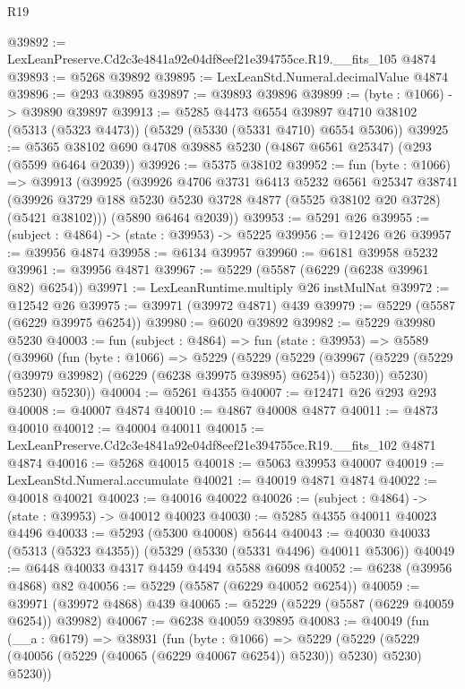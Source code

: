 \begin{lexlean}{R19}
\begin{coremodule}
@39892 := LexLeanPreserve.Cd2c3e4841a92e04df8eef21e394755ce.R19.__fits_105 @4874
@39893 := @5268 @39892
@39895 := LexLeanStd.Numeral.decimalValue @4874
@39896 := @293 @39895
@39897 := @39893 @39896
@39899 := (byte : @1066) -> @39890 @39897
@39913 := @5285
    @4473
    @6554
    @39897
    @4710
    @38102
    (@5313 (@5323 @4473))
    (@5329 (@5330 (@5331 @4710) @6554 @5306))
@39925 := @5365 @38102 @690 @4708 @39885 @5230 (@4867 @6561 @25347) (@293 (@5599 @6464 @2039))
@39926 := @5375 @38102
@39952 := fun (byte : @1066) =>
  @39913
    (@39925
      (@39926
        @4706
        @3731
        @6413
        @5232
        @6561
        @25347
        @38741
        (@39926 @3729 @188 @5230 @5230 @3728 @4877 (@5525 @38102 @20 @3728) (@5421 @38102)))
      (@5890 @6464 @2039))
@39953 := @5291 @26
@39955 := (subject : @4864) -> (state : @39953) -> @5225
@39956 := @12426 @26
@39957 := @39956 @4874
@39958 := @6134 @39957
@39960 := @6181 @39958 @5232
@39961 := @39956 @4871
@39967 := @5229 (@5587 (@6229 (@6238 @39961 @82) @6254))
@39971 := LexLeanRuntime.multiply @26 instMulNat
@39972 := @12542 @26
@39975 := @39971 (@39972 @4871) @439
@39979 := @5229 (@5587 (@6229 @39975 @6254))
@39980 := @6020 @39892
@39982 := @5229 @39980 @5230
@40003 := fun (subject : @4864) =>
  fun (state : @39953) =>
  @5589
    (@39960
      (fun (byte : @1066) =>
      @5229
        (@5229
          (@5229
            (@39967 (@5229 (@5229 (@39979 @39982) (@6229 (@6238 @39975 @39895) @6254)) @5230))
            @5230)
          @5230)
        @5230))
@40004 := @5261 @4355
@40007 := @12471 @26 @293 @293
@40008 := @40007 @4874
@40010 := @4867 @40008 @4877
@40011 := @4873 @40010
@40012 := @40004 @40011
@40015 := LexLeanPreserve.Cd2c3e4841a92e04df8eef21e394755ce.R19.__fits_102 @4871 @4874
@40016 := @5268 @40015
@40018 := @5063 @39953 @40007
@40019 := LexLeanStd.Numeral.accumulate
@40021 := @40019 @4871 @4874
@40022 := @40018 @40021
@40023 := @40016 @40022
@40026 := (subject : @4864) -> (state : @39953) -> @40012 @40023
@40030 := @5285 @4355 @40011 @40023 @4496
@40033 := @5293 (@5300 @40008) @5644
@40043 := @40030 @40033 (@5313 (@5323 @4355)) (@5329 (@5330 (@5331 @4496) @40011 @5306))
@40049 := @6448 @40033 @4317 @4459 @4494 @5588 @6098
@40052 := @6238 (@39956 @4868) @82
@40056 := @5229 (@5587 (@6229 @40052 @6254))
@40059 := @39971 (@39972 @4868) @439
@40065 := @5229 (@5229 (@5587 (@6229 @40059 @6254)) @39982)
@40067 := @6238 @40059 @39895
@40083 := @40049
    (fun (__a : @6179) =>
    @38931
      (fun (byte : @1066) =>
      @5229 (@5229 (@5229 (@40056 (@5229 (@40065 (@6229 @40067 @6254)) @5230)) @5230) @5230) @5230))

\end{coremodule}
\end{lexlean}
